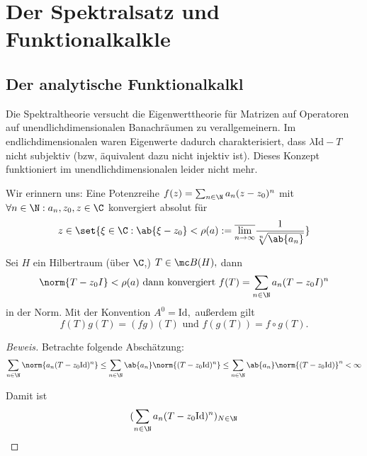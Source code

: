 \chapter{Der Spektralsatz und Funktionalkalk\us le}
\section{Der analytische Funktionalkalk\us l}
\begin{rem}
	
	Die Spektraltheorie versucht die Eigenwerttheorie für Matrizen auf Operatoren auf unendlichdimensionalen Banachräumen zu verallgemeinern. Im endlichdimensionalen waren Eigenwerte dadurch charakterisiert, dass $\lambda \text{Id} - T$ nicht subjektiv (bzw, äquivalent dazu nicht injektiv ist). Dieses Konzept funktioniert im unendlichdimensionalen leider nicht mehr.
	
\end{rem}


\begin{rem}
	
	Wir erinnern uns: Eine Potenzreihe $f(z) = \sum_{n \in \N} a_n(z-z_0)^n$ mit $\forall n \in \N: a_n, z_0, z \in \C$ konvergiert absolut für \[z \in \set{\xi \in \C: \ab{\xi-z_0}< \rho(a) := \overline{\lim_{n \to \infty}} \frac{1}{\sqrt[n]{\ab{a_n}}}} \]
	
\end{rem}


\begin{theorem} Sei $H$ ein Hilbertraum (über $\C$,) $T \in \mc B(H),$ dann \[\norm{T-z_0I}< \rho(a) \text{ dann konvergiert } f(T) = \sum_{n \in \N} a_n(T-z_0I)^n\] in der Norm. Mit der Konvention $A^0 = \text{Id},$ außerdem gilt \[f(T)g(T) = (fg)(T) \text{ und } f(g(T)) = f \circ g(T).\]
	
	\begin{proof}[Beweis] Betrachte folgende Abschätzung: \[\sum_{n \in \N} \norm{a_n(T-z_0\text{Id})^n} \leq \sum_{n \in \N} \ab{a_n}\norm{(T-z_0\text{Id})^n} \leq \sum_{n \in \N} \ab{a_n}\norm{(T-z_0\text{Id})}^n < \infty\]
		
		Damit ist \[(\sum_{n \in \N} a_n(T-z_0 \text{Id})^n)_{N \in \N}\]
		
		
		
	\end{proof}
	
\end{theorem}


